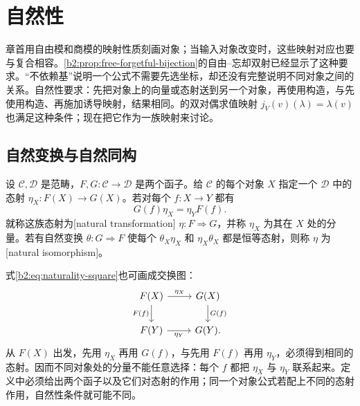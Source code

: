 
\section{自然性}
\label{b2:sec:0502}

章首用自由模和商模的映射性质刻画对象；当输入对象改变时，这些映射对应也要与复合相容。\cref{b2:prop:free-forgetful-bijection}的自由--忘却双射已经显示了这种要求。“不依赖基”说明一个公式不需要先选坐标，却还没有完整说明不同对象之间的关系。自然性要求：先把对象上的向量或态射送到另一个对象，再使用构造，与先使用构造、再施加诱导映射，结果相同。的双对偶求值映射 \(j_V(v)(\lambda)=\lambda(v)\) 也满足这种条件；现在把它作为一族映射来讨论。

%
%

\subsection{自然变换与自然同构}
\label{b2:subsec:0502:01}

\begin{definition}\label{b2:def:natural-transformation}
	设 \(\mathcal C,\mathcal D\) 是范畴，\(F,G:\mathcal C\rightarrow\mathcal D\) 是两个函子。给 \(\mathcal C\) 的每个对象 \(X\) 指定一个 \(\mathcal D\) 中的态射 \(\eta_X:F(X)\rightarrow G(X)\)。若对每个 \(f:X\rightarrow Y\) 都有
	\begin{equation}\label{b2:eq:naturality-square}
		G(f)\eta_X=\eta_YF(f).
	\end{equation}
	就称这族态射为[natural transformation] \(\eta:F\Rightarrow G\)，并称 \(\eta_X\) 为其在 \(X\) 处的分量。若有自然变换 \(\theta:G\Rightarrow F\) 使每个 \(\theta_X\eta_X\) 和 \(\eta_X\theta_X\) 都是恒等态射，则称 \(\eta\) 为[natural isomorphism]。
\end{definition}

式\eqref{b2:eq:naturality-square}也可画成交换图：
\[
	\begin{tikzcd}
		F(X)\arrow[r,"\eta_X"]\arrow[d,"F(f)"']&G(X)\arrow[d,"G(f)"]\\
		F(Y)\arrow[r,"\eta_Y"']&G(Y).
	\end{tikzcd}
\]
从 \(F(X)\) 出发，先用 \(\eta_X\) 再用 \(G(f)\)，与先用 \(F(f)\) 再用 \(\eta_Y\)，必须得到相同的态射。因而不同对象处的分量不能任意选择：每个 \(f\) 都把 \(\eta_X\) 与 \(\eta_Y\) 联系起来。定义中必须给出两个函子以及它们对态射的作用；同一个对象公式若配上不同的态射作用，自然性条件就可能不同。

